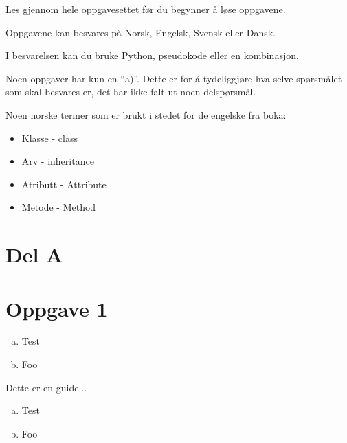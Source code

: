 Les gjennom hele oppgavesettet før du begynner å løse oppgavene. 

Oppgavene kan besvares på Norsk, Engelsk, Svensk eller Dansk. 

I besvarelsen kan du bruke Python, pseudokode eller en kombinasjon.

Noen oppgaver har kun en ``a)''. Dette er for å tydeliggjøre hva selve
spørsmålet som skal besvares er, det har ikke falt ut noen delspørsmål.

Noen norske termer som er brukt i stedet for de engelske fra boka: 
\begin{itemize}
\item Klasse - class
\item Arv - inheritance
\item Atributt - Attribute
\item Metode - Method
\end{itemize}

\section*{Del A}

\section*{Oppgave 1}

\begin{enumerate}[a)]
\item Test
\item Foo
\end{enumerate}

\begin{eguide}
Dette er en guide... 
\begin{enumerate}[a)]
\item Test
\item Foo
\end{enumerate}
\end{eguide}


